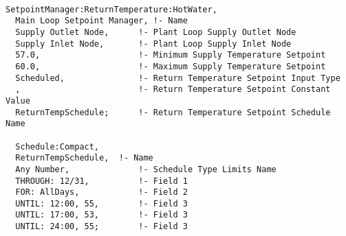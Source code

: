 \begin{lstlisting}

SetpointManager:ReturnTemperature:HotWater,
  Main Loop Setpoint Manager, !- Name
  Supply Outlet Node,      !- Plant Loop Supply Outlet Node
  Supply Inlet Node,       !- Plant Loop Supply Inlet Node
  57.0,                    !- Minimum Supply Temperature Setpoint
  60.0,                    !- Maximum Supply Temperature Setpoint
  Scheduled,               !- Return Temperature Setpoint Input Type
  ,                        !- Return Temperature Setpoint Constant Value
  ReturnTempSchedule;      !- Return Temperature Setpoint Schedule Name

  Schedule:Compact,
  ReturnTempSchedule,  !- Name
  Any Number,              !- Schedule Type Limits Name
  THROUGH: 12/31,          !- Field 1
  FOR: AllDays,            !- Field 2
  UNTIL: 12:00, 55,        !- Field 3
  UNTIL: 17:00, 53,        !- Field 3
  UNTIL: 24:00, 55;        !- Field 3
\end{lstlisting}